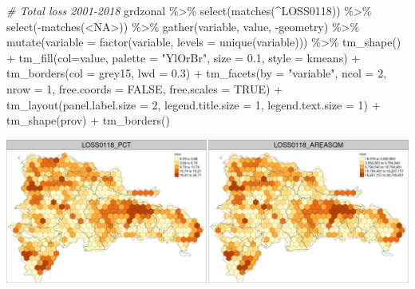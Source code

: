 \documentclass[10pt,landscape,a3paper]{article}
\newenvironment{Shaded}{\begin{snugshade}}{\end{snugshade}}
\newcommand{\AttributeTok}[1]{\textcolor[rgb]{0.77,0.63,0.00}{#1}}
\newcommand{\CommentTok}[1]{\textcolor[rgb]{0.56,0.35,0.01}{\textit{#1}}}
\newcommand{\ConstantTok}[1]{\textcolor[rgb]{0.00,0.00,0.00}{#1}}
\newcommand{\DecValTok}[1]{\textcolor[rgb]{0.00,0.00,0.81}{#1}}
\newcommand{\FloatTok}[1]{\textcolor[rgb]{0.00,0.00,0.81}{#1}}
\newcommand{\FunctionTok}[1]{\textcolor[rgb]{0.00,0.00,0.00}{#1}}
\newcommand{\NormalTok}[1]{#1}
\newcommand{\SpecialCharTok}[1]{\textcolor[rgb]{0.00,0.00,0.00}{#1}}
\newcommand{\StringTok}[1]{\textcolor[rgb]{0.31,0.60,0.02}{#1}}
\begin{document}
\begin{Shaded}
\begin{Highlighting}[]

\CommentTok{\# Total loss 2001{-}2018}
\NormalTok{grdzonal }\SpecialCharTok{\%\textgreater{}\%} \FunctionTok{select}\NormalTok{(}\FunctionTok{matches}\NormalTok{(}\StringTok{\textquotesingle{}\^{}LOSS0118\textquotesingle{}}\NormalTok{)) }\SpecialCharTok{\%\textgreater{}\%} \FunctionTok{select}\NormalTok{(}\SpecialCharTok{{-}}\FunctionTok{matches}\NormalTok{(}\StringTok{\textquotesingle{}\textless{}NA\textgreater{}\textquotesingle{}}\NormalTok{)) }\SpecialCharTok{\%\textgreater{}\%} 
  \FunctionTok{gather}\NormalTok{(variable, value, }\SpecialCharTok{{-}}\NormalTok{geometry) }\SpecialCharTok{\%\textgreater{}\%}
  \FunctionTok{mutate}\NormalTok{(}\AttributeTok{variable =} \FunctionTok{factor}\NormalTok{(variable, }\AttributeTok{levels =} \FunctionTok{unique}\NormalTok{(variable))) }\SpecialCharTok{\%\textgreater{}\%} 
  \FunctionTok{tm\_shape}\NormalTok{() }\SpecialCharTok{+}
  \FunctionTok{tm\_fill}\NormalTok{(}\AttributeTok{col=}\StringTok{\textquotesingle{}value\textquotesingle{}}\NormalTok{, }\AttributeTok{palette =} \StringTok{"YlOrBr"}\NormalTok{, }\AttributeTok{size =} \FloatTok{0.1}\NormalTok{, }\AttributeTok{style =} \StringTok{\textquotesingle{}kmeans\textquotesingle{}}\NormalTok{) }\SpecialCharTok{+}
  \FunctionTok{tm\_borders}\NormalTok{(}\AttributeTok{col =} \StringTok{\textquotesingle{}grey15\textquotesingle{}}\NormalTok{, }\AttributeTok{lwd =} \FloatTok{0.3}\NormalTok{) }\SpecialCharTok{+}
  \FunctionTok{tm\_facets}\NormalTok{(}\AttributeTok{by =} \StringTok{"variable"}\NormalTok{, }\AttributeTok{ncol =} \DecValTok{2}\NormalTok{, }\AttributeTok{nrow =} \DecValTok{1}\NormalTok{, }\AttributeTok{free.coords =} \ConstantTok{FALSE}\NormalTok{, }\AttributeTok{free.scales =} \ConstantTok{TRUE}\NormalTok{) }\SpecialCharTok{+}
  \FunctionTok{tm\_layout}\NormalTok{(}\AttributeTok{panel.label.size =} \DecValTok{2}\NormalTok{, }\AttributeTok{legend.title.size =} \DecValTok{1}\NormalTok{, }\AttributeTok{legend.text.size =} \DecValTok{1}\NormalTok{) }\SpecialCharTok{+}
  \FunctionTok{tm\_shape}\NormalTok{(prov) }\SpecialCharTok{+} \FunctionTok{tm\_borders}\NormalTok{()}
\end{Highlighting}
\end{Shaded}

\begin{center}\includegraphics{img/zonal-long-term-grid-7} \end{center}
\end{document}
